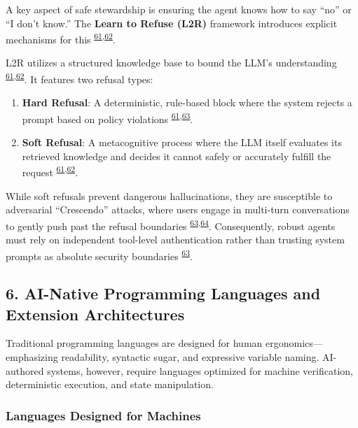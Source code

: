 \documentclass[
  11pt,
]{article}
\begin{document}
A key aspect of safe stewardship is ensuring the agent knows how to say
``no'' or ``I don't know.'' The \textbf{Learn to Refuse (L2R)} framework
introduces explicit mechanisms for this
\textsuperscript{\protect\hyperlink{cite-61}{61},\protect\hyperlink{cite-62}{62}}.

L2R utilizes a structured knowledge base to bound the LLM's
understanding
\textsuperscript{\protect\hyperlink{cite-61}{61},\protect\hyperlink{cite-62}{62}}.
It features two refusal types:

\begin{enumerate}
\def\labelenumi{\arabic{enumi}.}
\item
  \hypertarget{cite-1}{}
  \textbf{Hard Refusal}: A deterministic, rule-based block where the
  system rejects a prompt based on policy violations
  \textsuperscript{\protect\hyperlink{cite-61}{61},\protect\hyperlink{cite-63}{63}}.
\item
  \hypertarget{cite-2}{}
  \textbf{Soft Refusal}: A metacognitive process where the LLM itself
  evaluates its retrieved knowledge and decides it cannot safely or
  accurately fulfill the request
  \textsuperscript{\protect\hyperlink{cite-61}{61},\protect\hyperlink{cite-62}{62}}.
\end{enumerate}

While soft refusals prevent dangerous hallucinations, they are
susceptible to adversarial ``Crescendo'' attacks, where users engage in
multi-turn conversations to gently push past the refusal boundaries
\textsuperscript{\protect\hyperlink{cite-63}{63},\protect\hyperlink{cite-64}{64}}.
Consequently, robust agents must rely on independent tool-level
authentication rather than trusting system prompts as absolute security
boundaries \textsuperscript{\protect\hyperlink{cite-63}{63}}.

\hypertarget{ai-native-programming-languages-and-extension-architectures}{%
\subsection{6. AI-Native Programming Languages and Extension
Architectures}\label{ai-native-programming-languages-and-extension-architectures}}

Traditional programming languages are designed for human
ergonomics---emphasizing readability, syntactic sugar, and expressive
variable naming. AI-authored systems, however, require languages
optimized for machine verification, deterministic execution, and state
manipulation.

\hypertarget{languages-designed-for-machines}{%
\subsubsection{Languages Designed for
Machines}\label{languages-designed-for-machines}}
\end{document}
